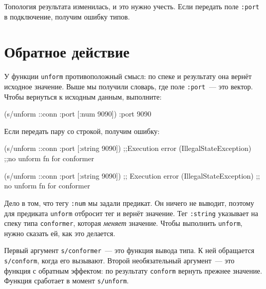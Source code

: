 Топология результата изменилась, и это нужно учесть. Если передать поле
\verb|:port| в подключение, получим ошибку типов.

\section{Обратное действие}


У функции \verb|unform| противоположный смысл: по спеке и результату она
вернёт исходное значение. Выше мы получили словарь, где поле \verb|:port|~--- это
вектор. Чтобы вернуться к исходным данным, выполните:

\begin{english}
  \begin{clojure}
(s/unform ::conn {:port [:num 9090]})
{:port 9090}
  \end{clojure}
\end{english}

\noindent
Если передать пару со строкой, получим ошибку:

\ifx\devicetype\mobile

\begin{english}
  \begin{clojure}
(s/unform ::conn {:port [:string 9090]})
;;Execution error (IllegalStateException)
;;no unform fn for conformer
  \end{clojure}
\end{english}

\else

\begin{english}
  \begin{clojure}
(s/unform ::conn {:port [:string 9090]})
;; Execution error (IllegalStateException)
;; no unform fn for conformer
  \end{clojure}
\end{english}

\fi

Дело в том, что тегу \verb|:num| мы задали предикат. Он ничего не выводит,
поэтому для предиката \verb|unform| отбросит тег и вернёт значение. Тег
\verb|:string| указывает на спеку типа \verb|conformer|, которая
\emph{меняет} значение. Чтобы выполнить \verb|unform|, нужно сказать ей, как
это делается.


Первый аргумент \verb|s/conformer|~--- это функция вывода типа. К ней обращается
\verb|s/conform|, когда его вызывают. Второй необязательный аргумент~--- это
функция с обратным эффектом: по результату \verb|conform| вернуть прежнее
значение. Функция сработает в момент \verb|s/unform|.

